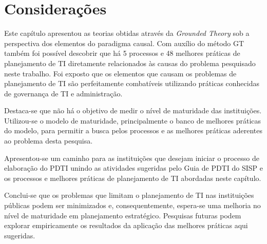 \section{Considerações}

Este capítulo apresentou as teorias obtidas através da \textit{Grounded Theory} sob a perspectiva dos elementos do paradigma causal. Com auxílio do método GT também foi possível descobrir que há 5 processos e 48 melhores práticas de planejamento de TI diretamente relacionados às causas do problema pesquisado neste trabalho. Foi exposto que os elementos que causam os problemas de planejamento de TI são perfeitamente combatíveis utilizando práticas conhecidas de governança de TI e administração. 

Destaca-se que não há o objetivo de medir o nível de maturidade das instituições. Utilizou-se o modelo de maturidade, principalmente o banco de melhores práticas do modelo, para permitir a busca pelos processos e as melhores práticas aderentes ao problema desta pesquisa.

Apresentou-se um caminho para as instituições que desejam iniciar o processo de elaboração do PDTI unindo as atividades sugeridas pelo Guia de PDTI do SISP e os processos e melhores práticas de planejamento de TI abordadas neste capítulo.

Conclui-se que os problemas que limitam o planejamento de TI nas instituições públicas podem ser minimizados e, consequentemente, espera-se uma melhoria no nível de maturidade em planejamento estratégico. Pesquisas futuras podem explorar empiricamente os resultados da aplicação das melhores práticas aqui sugeridas.